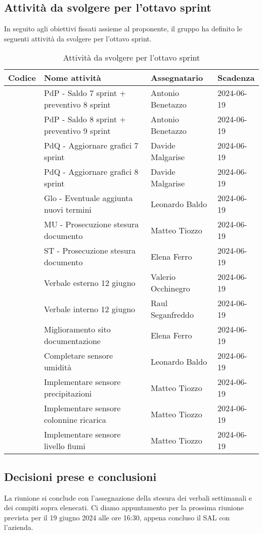 \documentclass[italian,12pt]{article}
\begin{document}
\newpage

\subsection{Attività da svolgere per l'ottavo sprint}
In seguito agli obiettivi fissati assieme al proponente, il gruppo ha definito le seguenti attività da svolgere per l'ottavo sprint.

\begin{table}[!h]
	\centering
	\begin{tabular}{ |l||l|l|l| }
		\hline
		\textbf{Codice}    & \textbf{Nome attività}                     & \textbf{Assegnatario} & \textbf{Scadenza} \\
		\hline
		\mySkip[86bz7hfxp] & PdP - Saldo 7 sprint + preventivo 8 sprint & Antonio Benetazzo     & 2024-06-19 \\
		\mySkip[86bz8e6c7] & PdP - Saldo 8 sprint + preventivo 9 sprint & Antonio Benetazzo     & 2024-06-19 \\
		\mySkip[86bz7hfyc] & PdQ - Aggiornare grafici 7 sprint          & Davide Malgarise      & 2024-06-19 \\
		\mySkip[86bz8e48h] & PdQ - Aggiornare grafici 8 sprint          & Davide Malgarise      & 2024-06-19 \\
		\mySkip[86bz8e8fx] & Glo - Eventuale aggiunta nuovi termini     & Leonardo Baldo        & 2024-06-19 \\
		\mySkip[86bz7hg4z] & MU - Prosecuzione stesura documento        & Matteo Tiozzo         & 2024-06-19 \\
		\mySkip[86bz7hg4d] & ST - Prosecuzione stesura documento        & Elena Ferro           & 2024-06-19 \\
		\mySkip[86bz7hftu] & Verbale esterno 12 giugno                  & Valerio Occhinegro    & 2024-06-19 \\
		\mySkip[86bz7hfu3] & Verbale interno 12 giugno                  & Raul Seganfreddo      & 2024-06-19 \\
		\mySkip[86bz8dwn3] & Miglioramento sito documentazione          & Elena Ferro           & 2024-06-19 \\
		\mySkip[86bz7hfte] & Completare sensore umidità                 & Leonardo Baldo        & 2024-06-19 \\
		\mySkip[86bz8dufz] & Implementare sensore precipitazioni        & Matteo Tiozzo         & 2024-06-19 \\
		\mySkip[86bz8duk3] & Implementare sensore colonnine ricarica    & Matteo Tiozzo         & 2024-06-19 \\
		\mySkip[86bz8dwdy] & Implementare sensore livello fiumi         & Matteo Tiozzo         & 2024-06-19 \\
		\hline
	\end{tabular}
	\caption{Attività da svolgere per l'ottavo sprint}
\end{table}

\subsection{Decisioni prese e conclusioni}
La riunione si conclude con l'assegnazione della stesura dei verbali settimanali e dei compiti sopra elenecati. Ci diamo appuntamento per la prossima riunione prevista per il 19 giugno 2024 alle ore 16:30, appena concluso il SAL con l'azienda.
\end{document}

